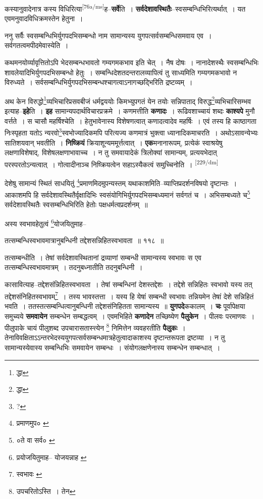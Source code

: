 \documentclass[article,12pt,a4paper]{memoir}
\begin{document}
	  \pstart कस्यानुवादेनात्र कस्य विधिरित्या\leavevmode\textsuperscript{\rmlatinfont\tiny [76a/ms]}ह--\textbf{सर्वे}ति । \textbf{सर्वदेशावस्थितैः}--स्वसम्बन्धिभिरित्यर्थात् । यत एवमनुवादविधिक्रमस्तेन हेतुना ।
	\pend
      

	  \pstart ननु सर्वैः स्वसम्बन्धिभिर्युगपदभिसम्बन्धो नाम सामान्यस्य युगपत्सर्वसम्बन्धिसमवाय एव । सर्वगतत्वमपीदमेवास्येति ।
	\pend
      

	  \pstart कथमनयोर्व्यावृत्तितोऽपि भेदसम्बन्धभावतो गम्यगमकभाव इति चेत् । नैष दोषः । नानादेशस्थैः स्वसम्बन्धिभिः शावलेयादिभिर्युगपदभिसम्बन्धो हेतुः । सम्बन्धिदेशतदन्तरालव्यापित्वं तु साध्यमिति गम्यगमकभावो न विरुध्यते । सर्वसम्बन्धिभिर्युगपदभिसम्बन्धश्चागत्वाऽनागच्छद्भिरिति द्रष्टव्यम् ।
	\pend
      

	  \pstart अथ केन विरुद्धो\footnote{द्धा}व्यभिचारिप्रसवबीजं धर्मद्वययोः किमभ्युपगतं येन तयोः सन्निपाताद् विरुद्ध\footnote{द्धा}व्यभिचारिसम्भव इत्याह--\textbf{इहे}ति । \textbf{इह} सामान्यपदार्थविचारप्रक्रमे । कणमत्तीति \textbf{कणादः} । रूढिवशाच्चायं शब्दः \textbf{काश्यपे} मुनौ वर्त्तते । स चासौ महर्षिश्चेति । हेतुभावेनास्य विशेषणत्वात् कणादत्वादेव महर्षिः । एवं तस्य हि काष्ठागता निःस्पृहता यतोऽ न्यरवो\footnote{?}स्वभोज्यादिकमपि परित्यज्य कणमात्रं भुक्त्वा ध्यानादिकमाचरति । अथोऽसावन्येभ्यः सातिशयवान् भवतीति । \textbf{निष्क्रियं} क्रियाशून्यममूर्त्तत्वात् । \textbf{एक}मनानारूपम्, प्रत्येकं स्वाश्रयेषु लक्षणाविशेषाद्, विशेषलक्षणाभावाच्च । न तु समवायादेकं त्रिलोक्यां सामान्यम्, प्रत्ययभेदात् परस्परतोऽन्यत्वात् । गोत्वादीनाञ्च निष्क्रियत्वेन सहाऽस्यैकत्वं समुच्चिनोति ।  \leavevmode\textsuperscript{\rmlatinfont\tiny [229/dm]} 
	  
	देशेषु सामान्यं स्थितं साधयितुं \footnote{प्रमाणमुप० \cite{dp-msC}}प्रमाणमिदमुपन्यस्तम् यथाकाशमिति--व्याप्तिप्रदर्शनविषयो दृष्टान्तः । आकाशमपि हि सर्वदेशावस्थितैर्वृक्षादिभिः स्वसंयोगिभिर्युगपदभिसम्बध्यमानं सर्वगतं च । अभिसम्बध्यते च\footnote{०ते वा सर्व० \cite{dp-msB}} सर्वदेशावस्थितैः स्वसम्बन्धिभिरिति हेतोः पक्षधर्मत्वप्रदर्शनम् ॥ 
	  
	अस्य स्वभावहेतुत्वं \footnote{प्रयोजयितुमाह--\cite{dp-msA} \cite{dp-msB} \cite{dp-edP} \cite{dp-edH} \cite{dp-edN} योजयन्नाह \cite{dp-edE}}योजयितुमाह-- 
	  
	तत्सम्बन्धिस्वभावमात्रानुबन्धिनी तद्देशसन्निहितस्वभावता ॥ ११८ ॥ 
	  
	तत्सम्बन्धीति । तेषां सर्वदेशावस्थितानां द्रव्याणां सम्बन्धी सामान्यस्य स्वभावः स एव तत्सम्बन्धिस्वभावमात्रम् । तदनुबध्नातीति तदनुबन्धिनी । 
	  
	कासावित्याह--तद्देशसंन्निहितस्वभावता । तेषां सम्बन्धिनां देशस्तद्देशः । तद्देशे सन्निहितः स्वभावो यस्य तत् तद्देशसंनिहितस्वभावम्\footnote{स्वभावः \cite{dp-msC} \cite{dp-msD} \cite{dp-edE}} । तस्य भावस्तत्ता । यस्य हि येषां सम्बन्धी स्वभावः तन्नियमेन तेषां देशे सन्निहितं भवति । ततस्तत्सम्बन्धित्वानुबन्धिनी तद्देशसंनिहितता सामान्यस्य ॥ \textbf{युगपदे}ककालम् । \textbf{चः} पूर्वापेक्षया समुच्यये \textbf{समवायेन} सम्बन्धेन सम्बद्धत्वम् । एवमभिहिते \textbf{कणादेन} तच्छिष्येण \textbf{पैलुकेन} । पीलवः परमाणवः । पीलुपाके चायं पीलुशब्द उपचारासतास्त्त्येन \footnote{उपचरितोऽस्ति । तेन} निमित्तेन व्यवहरतीति \textbf{पैलुकः} । तेनाविवक्षिताऽऽन्तरभेदस्ययुगपत्सर्वसम्बन्धमात्रहेतुत्वादाकाशस्य दृष्टान्तरूपता द्रष्टव्या । न तु सामान्यस्येवास्य सम्बन्धिभिः समवायेन सम्बन्धः । संयोगलक्षणेनास्य सम्बन्धेन सम्बन्धात् ।
	\pend
      
\end{document}
